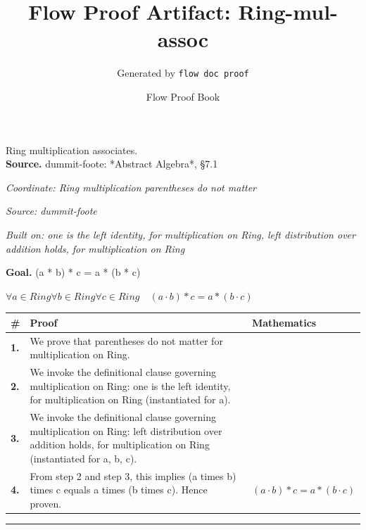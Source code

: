 \documentclass[11pt]{article}
\title{Flow Proof Artifact: Ring-mul-assoc}
\author{Generated by \texttt{flow doc proof}}
\date{Flow Proof Book}
\theoremstyle{definition}
\begin{document}
\maketitle
Ring multiplication associates.\\[0.5em]
\textbf{Source.} dummit-foote: *Abstract Algebra*, §7.1\\[0.5em]
\bigskip
{}\par
\smallskip\noindent\textit{Coordinate: Ring \cdot multiplication \cdot parentheses do not matter}\par
\smallskip\noindent\textit{Source: dummit-foote}\par
\smallskip\noindent\textit{Built on: one is the left identity, for multiplication on Ring, left distribution over addition holds, for multiplication on Ring}\par
\medskip
\noindent\textbf{Goal.} (a * b) * c = a * (b * c)\par
\noindent$\displaystyle \forall a \in Ring \forall b \in Ring \forall c \in Ring\quad (a \cdot b) * c = a * (b \cdot c)$\par
\medskip
\noindent
\begin{tabular}{@{} >{\raggedright\arraybackslash}p{} >{\raggedright\arraybackslash}p{} >{\raggedleft\arraybackslash}p{} @{}}
\textbf{\#} & \textbf{Proof} & \textbf{Mathematics} \\
\midrule
\textbf{1.} & We prove that parentheses do not matter for multiplication on Ring. & \\[0.45em]
\textbf{2.} & We invoke the definitional clause governing multiplication on Ring: one is the left identity, for multiplication on Ring (instantiated for a). & \\[0.45em]
\textbf{3.} & We invoke the definitional clause governing multiplication on Ring: left distribution over addition holds, for multiplication on Ring (instantiated for a, b, c). & \\[0.45em]
\textbf{4.} & From step 2 and step 3, this implies (a times b) times c equals a times (b times c). Hence proven. & $\displaystyle (a \cdot b) * c = a * (b \cdot c)$ \\[0.45em]
\bottomrule
\end{tabular}
\label{thm:Ring-multiplication-parentheses_do_not_matter}
\par\medskip\hrule
\end{document}
